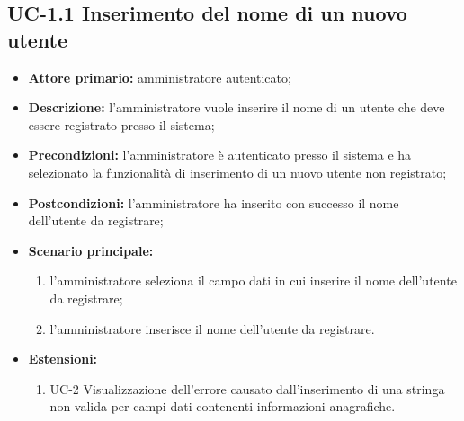 \subsection{UC-1.1 Inserimento del nome di un nuovo utente}
\begin{itemize}
	\item \textbf{Attore primario:} amministratore autenticato;

	\item \textbf{Descrizione:} l'amministratore vuole inserire il nome di un utente che deve essere registrato presso il sistema;

	\item \textbf{Precondizioni:} l'amministratore è autenticato presso il sistema e ha selezionato la funzionalità di inserimento di un nuovo utente non registrato;

	\item \textbf{Postcondizioni:} l'amministratore ha inserito con successo il nome dell'utente da registrare;

	\item \textbf{Scenario principale:}
		\begin{enumerate}
   			 \item l'amministratore seleziona il campo dati in cui inserire il nome dell'utente da registrare;
   			 \item l'amministratore inserisce il nome dell'utente da registrare.
		\end{enumerate}
	\item \textbf{Estensioni:}
		\begin{enumerate}
   			 \item UC-2 Visualizzazione dell'errore causato dall'inserimento di una stringa non valida per campi dati contenenti informazioni anagrafiche.
		\end{enumerate}
\end{itemize}
